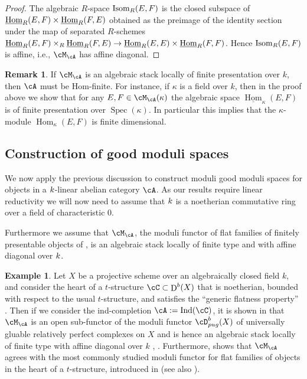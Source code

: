 \documentclass[a4paper]{amsart}
\numberwithin{equation}{section}
\theoremstyle{plain}
\theoremstyle{definition}
\newtheorem{rem}[thm]{Remark}
\newtheorem{ex}[thm]{Example}
\newcommand{\op}[1]{\!\!\mathop{\rm ~#1}\nolimits}
\DeclareMathOperator{\Spec}{Spec}
\DeclareMathOperator{\Hom}{Hom}
\newcommand{\uHom}{\underline{{\rm Hom}}}
\DeclareMathOperator{\D}{D}
\DeclareMathOperator{\Ind}{Ind}
\newcommand{\spref}[1]{\href{http://stacks.math.columbia.edu/tag/#1}{Tag #1}}
\begin{document}
\begin{proof}
The algebraic $R$-space $\op{Isom}_R(E,F)$ is the closed subspace of $\uHom_R(E,F) \times \uHom_R(F,E)$ obtained as the preimage of the identity section under the map of separated $R$-schemes $\uHom_R(E,F) \times_R \uHom_R(F,E) \to \uHom_{R}(E,E) \times \uHom_R(F,F)$. Hence $\op{Isom}_R(E,F)$ is affine, i.e., $\cM_\cA$ has affine diagonal.
\end{proof}

\begin{rem}
If $\cM_\cA$ is an algebraic stack locally of finite presentation over $k$, then $\cA$ must be Hom-finite. For instance, if $\kappa$ is a field over $k$, then in the proof above we show that for any $E,F \in \cM_\cA(\kappa)$ the algebraic space $\underline{\Hom}_\kappa(E,F)$ is of finite presentation over $\Spec(\kappa)$. In particular this implies that the $\kappa$-module $\Hom_\kappa(E,F)$ is finite dimensional.
\end{rem}

\subsection{Construction of good moduli spaces}


We now apply the previous discussion to construct moduli good moduli spaces for objects in a $k$-linear abelian category $\cA$. As our results require linear reductivity we will now need to assume that ${k}$ is a noetherian commutative ring over a field of characteristic $0$.

Furthermore we assume that $\cM_{\cA}$, the moduli functor of flat families of finitely presentable objects of , is an algebraic stack locally of finite type and with affine diagonal over $k$.

\begin{ex} \label{EX:bridgeland_1}
Let $X$ be a projective scheme over an algebraically closed field $k$, and consider the heart of a $t$-structure $\cC \subset \D^b(X)$ that is noetherian, bounded with respect to the usual $t$-structure, and satisfies the ``generic flatness property'' \cite[Prop.~3.5.1]{abramovich2006sheaves}. Then if we consider the ind-completion $\cA := \Ind(\cC)$, it is shown in \cite[Prop.~6.2.7]{hlinstability} that $\cM_\cA$ is an open sub-functor of the moduli functor $\cD^b_{pug}(X)$ of universally gluable relatively perfect complexes on $X$ and is hence an algebraic stack locally of finite type with affine diagonal over $k$ \cite{lieblich}, \cite[\spref{0DPW}]{stacks-project}. Furthermore, \cite[Prop.~6.2.7]{hlinstability} shows that $\cM_\cA$ agrees with the most commonly studied moduli functor for flat families of objects in the heart of a $t$-structure, introduced in \cite[Defn.~3.3.1]{abramovich2006sheaves} (see also \cite[Prop.~3.3.7]{polishchuk2007constant}).
\end{ex}
\end{document}
